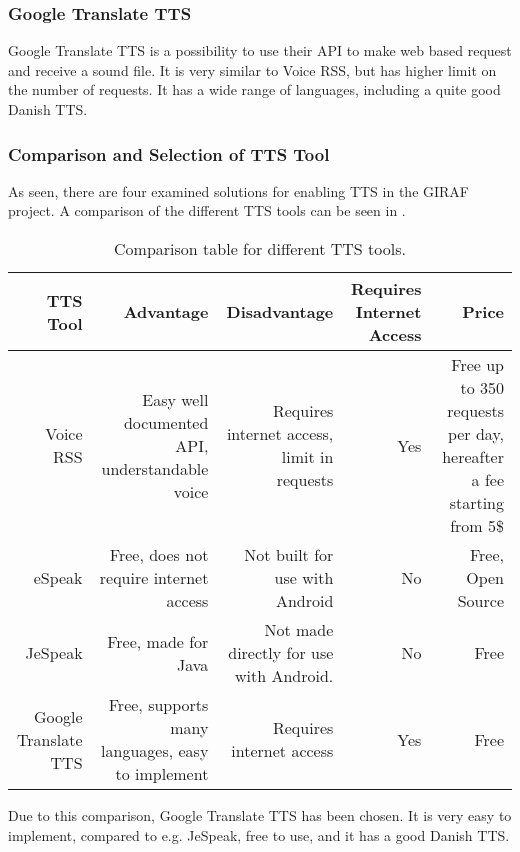 \subsubsection{Google Translate TTS}
Google Translate TTS is a possibility to use their API to make web based request and receive a sound file. It is very similar to Voice RSS, but has higher limit on the number of requests. It has a wide range of languages, including a quite good Danish TTS. 

\subsubsection{Comparison and Selection of TTS Tool}
As seen, there are four examined solutions for enabling TTS in the GIRAF project. A comparison of the different TTS tools can be seen in .


\begin{table}[H]
    \begin{tabularx}{\textwidth}{|R|R|R|R|R|}
    \hline
    \textbf{TTS Tool}             &\textbf{Advantage}                                   &\textbf{Disadvantage}                               & \textbf{Requires Internet Access} &\textbf{Price}                                                      \\ \hline
    Voice RSS            & Easy well documented API, understandable voice    & Requires internet access, limit in requests & Yes                     & Free up to 350 requests per day, hereafter a fee starting from 5\$ \\ \hline
    eSpeak               & Free, does not require internet access            & Not built for use with Android             & No                      & Free, Open Source                                          \\ \hline
    JeSpeak              & Free, made for Java                             & Not made directly for use with Android.    & No                      & Free                                                       \\ \hline
    Google Translate TTS & Free, supports many languages, easy to implement & Requires internet access                    & Yes                     & Free                                                       \\ \hline
    \end{tabularx}
    \caption{Comparison table for different TTS tools.}
    \label{tab:ttscomp}
\end{table}

Due to this comparison, Google Translate TTS has been chosen. It is very easy to implement, compared to e.g. JeSpeak, free to use, and it has a good Danish TTS.